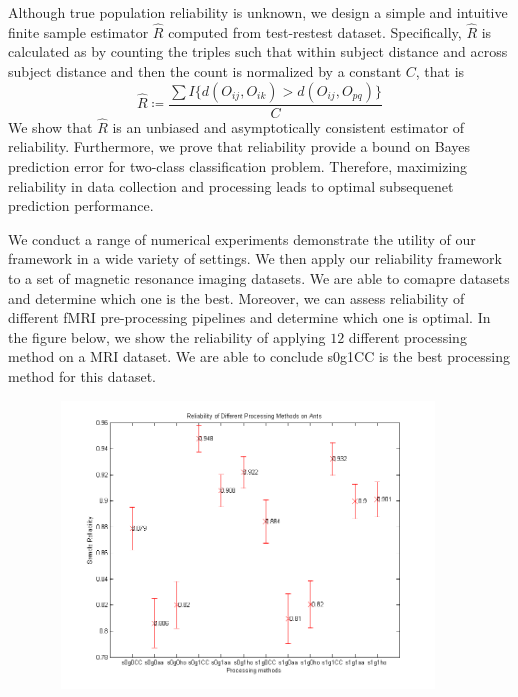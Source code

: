 \documentclass[a4paper]{article}
\begin{document}
\noindent Although true population reliability is unknown, we design a simple and intuitive finite sample estimator $\hat{R}$ computed from test-restest dataset. Specifically, $\hat{R}$ is calculated as by counting the triples such that within subject distance and across subject distance and then the count is normalized by a constant $C$, that is
\[\hat{R} \coloneqq \frac{\sum I\{d(O_{ij},O_{ik})>d(O_{ij},O_{pq})\}} {C} \] 
We show that $\hat{R}$ is an unbiased and asymptotically consistent estimator of reliability. Furthermore, we prove that reliability provide a bound on Bayes prediction error for two-class classification problem. Therefore, maximizing reliability in data collection and processing leads to optimal subsequenet prediction performance.


\noindent We conduct a range of numerical experiments demonstrate the utility of our framework in a wide variety of settings. We then apply our reliability framework to a set of magnetic resonance imaging datasets. We are able to comapre datasets and determine which one is the best. Moreover, we can assess reliability of different fMRI pre-processing pipelines and determine which one is optimal. In the figure below, we show the reliability of applying $12$ different processing method on a MRI dataset. We are able to conclude s0g1CC is the best processing method for this dataset.

\begin{center}
\includegraphics[width=5in,height=3in]{ants_reliability}
\end{center}
\end{document}
